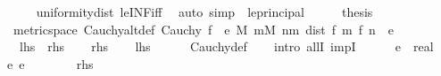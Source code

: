 \begin{isabellebody}
\ \ \ \ \isamarkupfalse%
\ uniformity{\isacharunderscore}{\kern0pt}dist\ le{\isacharunderscore}{\kern0pt}INF{\isacharunderscore}{\kern0pt}iff\ \isamarkupfalse%
\ {\isacharparenleft}{\kern0pt}auto\ simp{\isacharcolon}{\kern0pt}\ {\isacharasterisk}{\kern0pt}\ le{\isacharunderscore}{\kern0pt}principal{\isacharparenright}{\kern0pt}\isanewline
\ \ \isamarkupfalse%
\ \isamarkupfalse%
\ {\isacharquery}{\kern0pt}thesis\ \isacommand{{\isachardot}{\kern0pt}}\isamarkupfalse%
\isanewline
{}\isamarkupfalse%
%
\endisatagproof
{\isafoldproof}%
%
\isadelimproof
\isanewline
%
\endisadelimproof
\isanewline
{}\isamarkupfalse%
\ {\isacharparenleft}{\kern0pt}\ metric{\isacharunderscore}{\kern0pt}space{\isacharparenright}{\kern0pt}\ Cauchy{\isacharunderscore}{\kern0pt}altdef{\isacharcolon}{\kern0pt}\ {\isachardoublequoteopen}Cauchy\ f\ {\isasymlongleftrightarrow}\ {\isacharparenleft}{\kern0pt}{\isasymforall}e{\isachargreater}{\kern0pt}{}{\isachardot}{\kern0pt}\ {\isasymexists}M{\isachardot}{\kern0pt}\ {\isasymforall}m{\isasymge}M{\isachardot}{\kern0pt}\ {\isasymforall}n{\isachargreater}{\kern0pt}m{\isachardot}{\kern0pt}\ dist\ {\isacharparenleft}{\kern0pt}f\ m{\isacharparenright}{\kern0pt}\ {\isacharparenleft}{\kern0pt}f\ n{\isacharparenright}{\kern0pt}\ {\isacharless}{\kern0pt}\ e{\isacharparenright}{\kern0pt}{\isachardoublequoteclose}\isanewline
\ \ {\isacharparenleft}{\kern0pt}\ {\isachardoublequoteopen}{\isacharquery}{\kern0pt}lhs\ {\isasymlongleftrightarrow}\ {\isacharquery}{\kern0pt}rhs{\isachardoublequoteclose}{\isacharparenright}{\kern0pt}\isanewline
%
\isadelimproof
%
\endisadelimproof
%
\isatagproof
{}\isamarkupfalse%
\isanewline
\ \ \isamarkupfalse%
\ {\isacharquery}{\kern0pt}rhs\isanewline
\ \ \isamarkupfalse%
\ {\isacharquery}{\kern0pt}lhs\isanewline
\ \ \ \ \isamarkupfalse%
\ Cauchy{\isacharunderscore}{\kern0pt}def\isanewline
\ \ \isamarkupfalse%
\ {\isacharparenleft}{\kern0pt}intro\ allI\ impI{\isacharparenright}{\kern0pt}\isanewline
\ \ \ \ \isamarkupfalse%
\ e\ {\isacharcolon}{\kern0pt}{\isacharcolon}{\kern0pt}\ real\ \isamarkupfalse%
\ e{\isacharcolon}{\kern0pt}\ {\isachardoublequoteopen}e\ {\isachargreater}{\kern0pt}\ {}{\isachardoublequoteclose}\isanewline
\ \ \ \ \isamarkupfalse%
\ {\isacartoucheopen}{\isacharquery}{\kern0pt}rhs{\isacartoucheclose}\ \isamarkupfalse%

\end{isabellebody}
